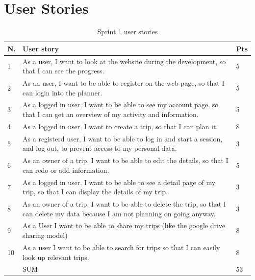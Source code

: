 \documentclass[a4paper]{article}
\begin{document}
\appendix

\section{User Stories}
\label{sec:user-stories}

\begin{table}[!h]
  \begin{tabulary}{1.0\textwidth}{|L|L|L|}
    \hline
    N. & User story & Pts \\ \hline
    
    1&As a user, I want to look at the website during the development, so that I can see the progress.
    & 5 \\ \hline
    
    2&As an user, I want to be able to register on the web page, so that I can login into the planner.
    & 5 \\ \hline

    3&As a logged in user, I want to be able to see my account page, so that I can get an overview of my activity and information.
    & 5 \\ \hline

    4&As a logged in user, I want to create a trip, so that I can plan it. 
    & 8 \\ \hline

    5&As a registerd user, I want to be able to log in and start a session, and log out, to prevent access to my personal data. & 3 \\ \hline

    6&As an owner of a trip, I want to be able to edit the details, so that I can redo or add information. & 5 \\ \hline

    7&As a logged in user, I want to be able to see a detail page of my trip, so that I can display the details of my trip. & 3 \\ \hline

    8&As an owner of a trip, I want to be able to delete the trip, so that I can delete my data because I am not planning on going anyway. & 3 \\ \hline

    9&As a User I want to be able to share my trips (like the google drive sharing model) & 8 \\ \hline

    10&As a user I want to be able to search for trips so that I can easily look up relevant trips. & 8 \\ \hline
    &SUM & 53 \\ \hline
  \end{tabulary}
  \caption{Sprint 1 user stories}
\end{table}
\end{document}
